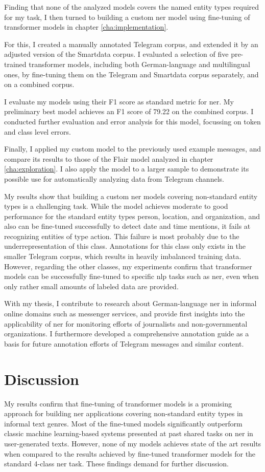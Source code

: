 Finding that none of the analyzed models covers the named entity types required for my task, I then turned to building a custom \gls{ner} model using fine-tuning of transformer models in chapter \ref{cha:implementation}. 

For this, I created a manually annotated Telegram corpus, and extended it by an adjusted version of the Smartdata corpus. I evaluated a selection of five pre-trained transformer models, including both German-language and multilingual ones, by fine-tuning them on the Telegram and Smartdata corpus separately, and on a combined corpus.

I evaluate my models using their F1 score as standard metric for \gls{ner}. My preliminary best model achieves an F1 score of 79.22 on the combined corpus. I conducted further evaluation and error analysis for this model, focussing on token and class level errors. 

Finally, I applied my custom model to the previously used example messages, and compare its results to those of the Flair model analyzed in chapter \ref{cha:exploration}. I also apply the model to a larger sample to demonstrate its possible use for automatically analyzing data from Telegram channels. 

My results show that building a custom \gls{ner} models covering non-standard entity types is a challenging task. While the model achieves moderate to good performance for the standard entity types person, location, and organization, and also can be fine-tuned successfully to detect date and time mentions, it fails at recognizing entities of type action. This failure is most probably due to the underrepresentation of this class. Annotations for this class only exists in the smaller Telegram corpus, which results in heavily imbalanced training data. However, regarding the other classes, my experiments confirm that transformer models can be successfully fine-tuned to specific \gls{nlp} tasks such as \gls{ner}, even when only rather small amounts of labeled data are provided.

With my thesis, I contribute to research about German-language \gls{ner} in informal online domains such as messenger services, and provide first insights into the applicability of \gls{ner} for monitoring efforts of journalists and non-governmental organizations. I furthermore developed a comprehensive annotation guide as a basis for future annotation efforts of Telegram messages and similar content.

\section{Discussion}
My results confirm that fine-tuning of transformer models is a promising approach for building \gls{ner} applications covering non-standard entity types in informal text genres. Most of the fine-tuned models significantly outperform classic machine learning-based systems presented at past shared tasks on \gls{ner} in user-generated texts. However, none of my models achieves state of the art results when compared to the results achieved by fine-tuned transformer models for the standard 4-class \gls{ner} task. These findings demand for further discussion. 

